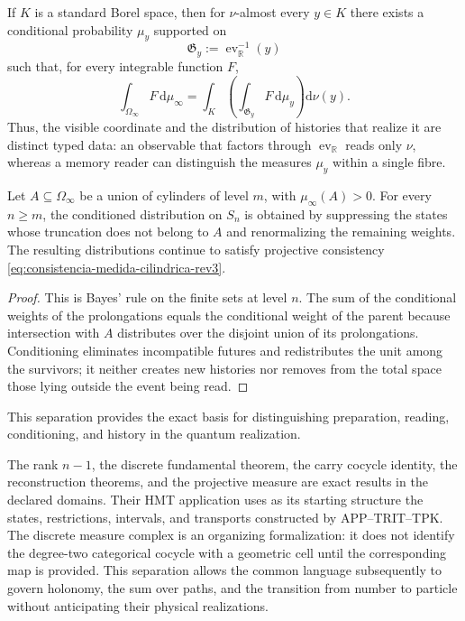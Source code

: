 \begin{proposition}
\label{prop:desintegracion-valores-genealogicos-rev3}
If \(K\) is a standard Borel space, then for \(\nu\)-almost every
\(y\in K\) there exists a conditional probability \(\mu_y\) supported on
\[
 \mathfrak G_y:=\operatorname{ev}_{\mathbb R}^{-1}(y)
\]
such that, for every integrable function \(F\),
\begin{equation}
 \int_{\Omega_\infty}F\,\mathrm d\mu_\infty
 =\int_K
   \left(\int_{\mathfrak G_y}F\,\mathrm d\mu_y\right)
   \mathrm d\nu(y).
 \label{eq:desintegracion-fibras-visibles-rev3}
\end{equation}
Thus, the visible coordinate and the distribution of histories that realize it
are distinct typed data: an observable that factors through
\(\operatorname{ev}_{\mathbb R}\) reads only \(\nu\), whereas a memory
reader can distinguish the measures \(\mu_y\) within a single fibre.
\end{proposition}

\begin{proposition}
\label{prop:condicionamiento-cilindrico-compatible-rev3}
Let \(A\subseteq\Omega_\infty\) be a union of cylinders of level \(m\), with
\(\mu_\infty(A)>0\). For every \(n\geq m\), the conditioned distribution
on \(S_n\) is obtained by suppressing the states whose truncation does not
belong to \(A\) and renormalizing the remaining weights. The resulting
distributions continue to satisfy projective consistency
\eqref{eq:consistencia-medida-cilindrica-rev3}.
\end{proposition}

\begin{proof}
This is Bayes' rule on the finite sets at level \(n\). The sum of the conditional weights of the prolongations equals the conditional weight of the parent because intersection with \(A\) distributes over the disjoint union of its prolongations. Conditioning eliminates incompatible futures and redistributes the unit among the survivors; it neither creates new histories nor removes from the total space those lying outside the event being read.
\end{proof}

This separation provides the exact basis for distinguishing preparation,
reading, conditioning, and history in the quantum realization.

\begin{statusbox}[title={Mathematical force and architectural function}] The rank \(n-1\), the discrete fundamental theorem, the carry cocycle identity, the reconstruction theorems, and the projective measure are exact results in the declared domains. Their HMT application uses as its starting structure the states, restrictions, intervals, and transports constructed by APP--TRIT--TPK. The discrete measure complex is an organizing formalization: it does not identify the degree-two categorical cocycle with a geometric cell until the corresponding map is provided. This separation allows the common language subsequently to govern holonomy, the sum over paths, and the transition from number to particle without anticipating their physical realizations.
\end{statusbox}
